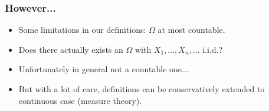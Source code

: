 \documentclass{beamer}
\begin{document}
\begin{frame}
  \frametitle{However...}
  \begin{itemize}
  \item<2-> Some limitations in our definitions: $\Omega$ at most countable.
  \item<3-> Does there actually exists an $\Omega$ with $X_1, \dots, X_n, \dots$ i.i.d.?
  \item<4-> Unfortunately in general not a countable one...
  \item<5-> But with a lot of care, definitions can be conservatively extended to continuous case (measure theory).
  \end{itemize}  
\end{frame}
\end{document}
